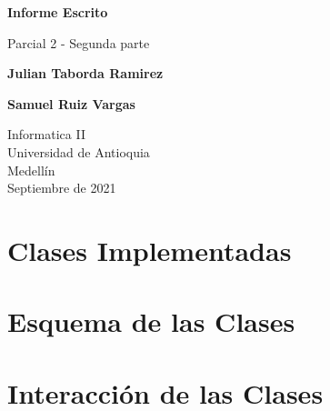 \documentclass{article}
\begin{document}
\begin{titlepage}
    \begin{center}
        \vspace*{1cm}
            
        \Huge
        \textbf{Informe Escrito}
            
        \vspace{0.5cm}
        \LARGE
        Parcial 2 - Segunda parte
            
        \vspace{1.5cm}
            
        \textbf{Julian Taborda Ramirez}
        
        \vspace{0.5cm}
        
        \textbf{Samuel Ruiz Vargas}
            
        \vfill
            
        \vspace{0.8cm}
            
        \Large
        Informatica II\\
        Universidad de Antioquia\\
        Medellín\\
        Septiembre de 2021
            
    \end{center}
\end{titlepage}

\tableofcontents
\vspace*{1.2cm}

\newpage

\section{Clases Implementadas}
\label{clases}

    \begin{flushleft}

    \end{flushleft}

    
\section{Esquema de las Clases}
\label{esquema}
    \begin{flushleft}

    \end{flushleft}
        
    
\section{Interacción de las Clases}
\label{interacciones}
    \begin{flushleft}
    
    \end{flushleft}
    
\end{document}
